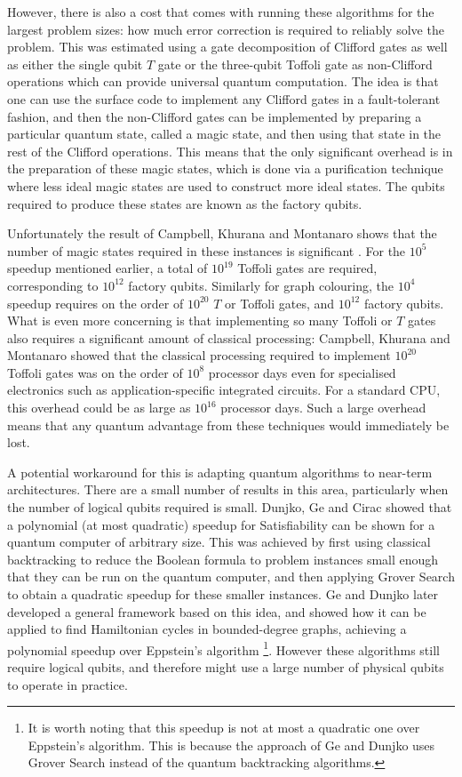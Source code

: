 However, there is also a cost that comes with running these algorithms for the largest problem sizes: how much error correction is required to reliably solve the problem. This was estimated using a gate decomposition of Clifford gates as well as either the single qubit $T$ gate or the three-qubit Toffoli gate as non-Clifford operations which can provide universal quantum computation. The idea is that one can use the surface code to implement any Clifford gates in a fault-tolerant fashion, and then the non-Clifford gates can be implemented by preparing a particular quantum state, called a magic state, and then using that state in the rest of the Clifford operations. This means that the only significant overhead is in the preparation of these magic states, which is done via a purification technique where less ideal magic states are used to construct more ideal states. The qubits required to produce these states are known as the factory qubits.

Unfortunately the result of Campbell, Khurana and Montanaro shows that the number of magic states required in these instances is significant \cite{campbell2019}. For the $10^5$ speedup mentioned earlier, a total of $10^{19}$ Toffoli gates are required, corresponding to $10^{12}$ factory qubits. Similarly for graph colouring, the $10^4$ speedup requires on the order of $10^{20}$ $T$ or Toffoli gates, and $10^{12}$ factory qubits. What is even more concerning is that implementing so many Toffoli or $T$ gates also requires a significant amount of classical processing: Campbell, Khurana and Montanaro showed that the classical processing required to implement $10^{20}$ Toffoli gates was on the order of $10^8$ processor days even for specialised electronics such as application-specific integrated circuits. For a standard CPU, this overhead could be as large as $10^{16}$ processor days. Such a large overhead means that any quantum advantage from these techniques would immediately be lost.

A potential workaround for this is adapting quantum algorithms to near-term architectures. There are a small number of results in this area, particularly when the number of logical qubits required is small. Dunjko, Ge and Cirac \cite{dunjko2018} showed that a polynomial (at most quadratic) speedup for Satisfiability can be shown for a quantum computer of arbitrary size. This was achieved by first using classical backtracking to reduce the Boolean formula to problem instances small enough that they can be run on the quantum computer, and then applying Grover Search to obtain a quadratic speedup for these smaller instances. Ge and Dunjko \cite{ge2019} later developed a general framework based on this idea, and showed how it can be applied to find Hamiltonian cycles in bounded-degree graphs, achieving a polynomial speedup over Eppstein's algorithm \cite{eppstein2007}\footnote{It is worth noting that this speedup is not at most a quadratic one over Eppstein's algorithm. This is because the approach of Ge and Dunjko uses Grover Search instead of the quantum backtracking algorithms.}. However these algorithms still require logical qubits, and therefore might use a large number of physical qubits to operate in practice.

